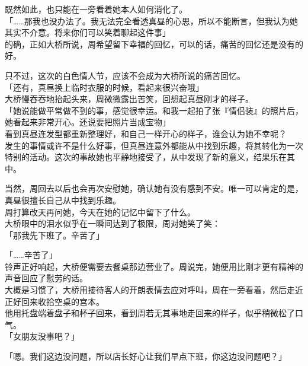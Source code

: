 既然如此，也只能在一旁看着她本人如何消化了。\\

「……那我也没办法了。我无法完全看透真昼的心思，所以不能断言，但我认为她其实不介意。将来你们可以笑着聊起这件事」\\

的确，正如大桥所说，周希望留下幸福的回忆，可以的话，痛苦的回忆还是没有的好。

只不过，这次的白色情人节，应该不会成为大桥所说的痛苦回忆。\\

「还有，真昼换上临时衣服的时候，看起来很兴奋哦」\\

大桥慢吞吞地抬起头来，周微微露出苦笑，回想起真昼刚才的样子。\\

「她说能做平常做不到的事，感觉很幸运。和我一起拍了张『情侣装』的照片后，她看起来非常开心。还说要把照片当成宝物」\\

看到真昼连发型都重新整理好，和自己一样开心的样子，谁会认为她不幸呢？\\

发生的事情或许不是什么好事，但真昼连意外都能从中找到乐趣，将其转化为一次特别的活动。这次的事故她也平静地接受了，从中发现了新的意义，结果乐在其中。

当然，周回去以后也会再次安慰她，确认她有没有感到不安。唯一可以肯定的是，真昼很擅长自己从中找到乐趣。\\

周打算改天再问她，今天在她的记忆中留下了什么。\\

大桥眼中的泪水似乎在一瞬间达到了极限，周对她笑了笑：\\

「那我先下班了。辛苦了」

「……辛苦了」\\

铃声正好响起，大桥便需要去餐桌那边营业了。周说完，她便用比刚才更有精神的声音回应了慰劳的话。\\

大概是习惯了，大桥用接待客人的开朗表情去应对呼叫，周在一旁看着，然后走近正好回来收拾空桌的宫本。\\

他用托盘端着盘子和杯子回来，看到周若无其事地走回来的样子，似乎稍微松了口气。\\

「女朋友没事吧？」

「嗯。我们这边没问题，所以店长好心让我们早点下班，你这边没问题吧？」

